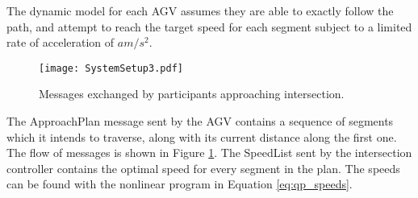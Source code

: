 The dynamic model for each AGV assumes they are able to exactly follow the path, and attempt to reach the target speed for each segment subject to a limited rate of acceleration of $a m/s^2$. 

\begin{figure}[ht]
\centering
\texttt{[image: SystemSetup3.pdf]}
\caption{Messages exchanged by participants approaching intersection.}
\label{fig:system_setup}
\end{figure}

The ApproachPlan message sent by the AGV contains a sequence of segments which it intends to traverse, along with its current distance along the first one.  The flow of messages is shown in Figure \ref{fig:system_setup}. The SpeedList sent by the intersection controller contains the optimal speed for every segment in the plan. The speeds can be found with the nonlinear program in Equation \ref{eq:qp_speeds}. 

